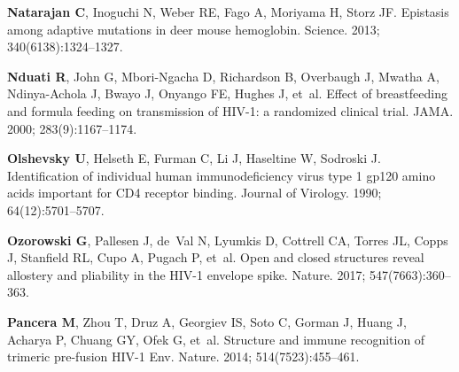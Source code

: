 \documentclass[9pt]{elife}
\begin{document}
\begin{thebibliography}{114}
\textbf{\color{eLifeMediumGrey} Natarajan C}, Inoguchi N, Weber RE, Fago A,
  Moriyama H, Storz JF.
\newblock Epistasis among adaptive mutations in deer mouse hemoglobin.
\newblock Science.  2013; 340(6138):1324--1327.

\textbf{\color{eLifeMediumGrey} Nduati R}, John G, Mbori-Ngacha D, Richardson
  B, Overbaugh J, Mwatha A, Ndinya-Achola J, Bwayo J, Onyango FE, Hughes J,
  et~al.
\newblock Effect of breastfeeding and formula feeding on transmission of HIV-1:
  a randomized clinical trial.
\newblock JAMA.  2000; 283(9):1167--1174.

\textbf{\color{eLifeMediumGrey} Olshevsky U}, Helseth E, Furman C, Li J,
  Haseltine W, Sodroski J.
\newblock Identification of individual human immunodeficiency virus type 1
  gp120 amino acids important for CD4 receptor binding.
\newblock Journal of Virology.  1990; 64(12):5701--5707.

\textbf{\color{eLifeMediumGrey} Ozorowski G}, Pallesen J, de~Val N, Lyumkis D,
  Cottrell CA, Torres JL, Copps J, Stanfield RL, Cupo A, Pugach P, et~al.
\newblock Open and closed structures reveal allostery and pliability in the
  HIV-1 envelope spike.
\newblock Nature.  2017; 547(7663):360--363.

\textbf{\color{eLifeMediumGrey} Pancera M}, Zhou T, Druz A, Georgiev IS, Soto
  C, Gorman J, Huang J, Acharya P, Chuang GY, Ofek G, et~al.
\newblock Structure and immune recognition of trimeric pre-fusion HIV-1 Env.
\newblock Nature.  2014; 514(7523):455--461.


\end{thebibliography}
\end{document}
